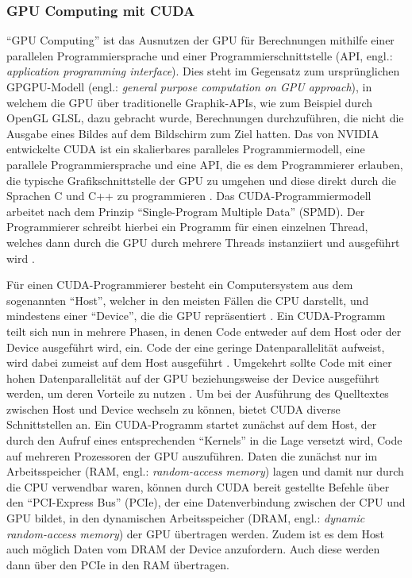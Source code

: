 \documentclass[crop=false]{standalone}
\begin{document}
      \subsubsection{GPU Computing mit CUDA} %
      \label{ssub:gpu_computing_mit_cuda}
        \enquote{GPU Computing} ist das Ausnutzen der GPU für Berechnungen mithilfe einer parallelen Programmiersprache und einer Programmierschnittstelle (API, engl.: \textit{application programming interface}).
        Dies steht im Gegensatz zum ursprünglichen GPGPU-Modell (engl.: \textit{general purpose computation on GPU approach}), in welchem die GPU über traditionelle Graphik-APIs, wie zum Beispiel durch OpenGL GLSL, dazu gebracht wurde, Berechnungen durchzuführen, die nicht die Ausgabe eines Bildes auf dem Bildschirm zum Ziel hatten.
        Das von NVIDIA entwickelte CUDA ist ein skalierbares paralleles Programmiermodell, eine parallele Programmiersprache und  eine API, die es dem Programmierer erlauben, die typische Grafikschnittstelle der GPU zu umgehen und diese direkt durch die Sprachen C und C++ zu programmieren \cite[S.~A5]{Patterson2011}.
        Das CUDA-Programmiermodell arbeitet nach dem Prinzip \enquote{Single-Program Multiple Data} (SPMD).
        Der Programmierer schreibt hierbei ein Programm für einen einzelnen Thread, welches dann durch die GPU durch mehrere Threads instanziiert und ausgeführt wird \cite[S.~A5]{Patterson2011}.

        Für einen CUDA-Programmierer besteht ein Computersystem aus dem sogenannten \enquote{Host}, welcher in den meisten Fällen die CPU darstellt, und mindestens einer \enquote{Device}, die die GPU repräsentiert \cite[S.~39]{Kirk2010}.
        Ein CUDA-Programm teilt sich nun in mehrere Phasen, in denen Code entweder auf dem Host oder der Device ausgeführt wird, ein.
        Code der eine geringe Datenparallelität aufweist, wird dabei zumeist auf dem Host ausgeführt \cite{Kirk2010}.
        Umgekehrt sollte Code mit einer hohen Datenparallelität auf der GPU beziehungsweise der Device ausgeführt werden, um deren Vorteile zu nutzen \cite{Kirk2010}.
        Um bei der Ausführung des Quelltextes zwischen Host und Device wechseln zu können, bietet CUDA diverse Schnittstellen an.
        Ein CUDA-Programm startet zunächst auf dem Host, der durch den Aufruf eines entsprechenden \enquote{Kernels} in die Lage versetzt wird, Code auf mehreren Prozessoren der GPU auszuführen.
        Daten die zunächst nur im Arbeitsspeicher (RAM, engl.: \textit{random-access memory}) lagen und damit nur durch die CPU verwendbar waren, können durch CUDA bereit gestellte Befehle über den \enquote{PCI-Express Bus} (PCIe), der eine Datenverbindung zwischen der CPU und GPU bildet, in den dynamischen Arbeitsspeicher (DRAM, engl.: \textit{dynamic random-access memory}) der GPU übertragen werden.
        Zudem ist es dem Host auch möglich Daten vom DRAM der Device anzufordern.
        Auch diese werden dann über den PCIe in den RAM übertragen.
        \cite{Sanders2011}
\end{document}
